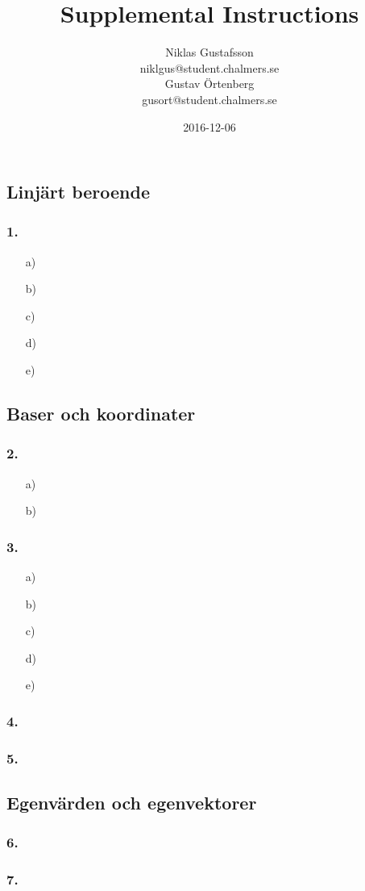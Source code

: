 \documentclass{article}
\title{Supplemental Instructions}
\author{Niklas Gustafsson \\ 
		\small{niklgus@student.chalmers.se} \\
		Gustav Örtenberg \\ 
		\small{gusort@student.chalmers.se}
}
\date{
      2016-12-06
     }
\begin{document}
\maketitle

\subsection*{Linjärt beroende}
\subsubsection*{1.}

\begin{itemize}
	\item[a) ]
	\item[b) ]
	\item[c) ] 
	\item[d) ] 
	\item[e) ] 
\end{itemize}

\subsection*{Baser och koordinater}
\subsubsection*{2.}
\begin{itemize}
	\item[a) ]
	\item[b) ] 
\end{itemize}

\subsubsection*{3.}
\begin{itemize}
	\item[a) ] 
	\item[b) ] 
	\item[c) ] 
	\item[d) ] 
	\item[e) ] 
\end{itemize}

\subsubsection*{4.}

\subsubsection*{5.}

\subsection*{Egenvärden och egenvektorer}
\subsubsection*{6.}

\subsubsection*{7.}
\end{document}
